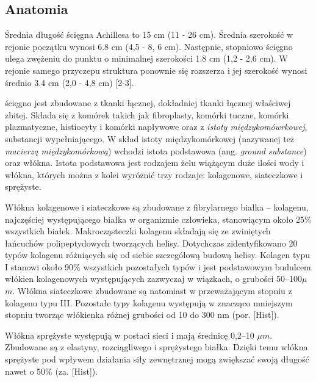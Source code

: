 \subsection{Anatomia}
Średnia długość ścięgna Achillesa to 15 cm (11 - 26 cm). Średnia szerokość w rejonie początku wynosi 6.8 cm (4,5 - 8, 6 cm). Następnie, stopniowo ścięgno ulega zwężeniu do punktu o minimalnej szerokości 1.8 cm (1,2 - 2,6 cm). W rejonie samego przyczepu struktura ponownie się rozszerza i jej szerokość wynosi średnio 3.4 cm (2,0 - 4,8 cm) [2-3].

ścięgno jest zbudowane z tkanki łącznej, dokładniej tkanki łącznej właściwej zbitej. Składa się z komórek takich jak fibroplasty, komórki tuczne, komórki plazmatyczne, histiocyty i komórki napływowe oraz z \textit{istoty międzykomówrkowej}, substancji wypełniającego. W skład istoty międzykomórkowej (nazywanej też \textit{macierzą międzykomórkową}) wchodzi istota podstawowa (ang. \textit{ground substance}) oraz włókna. Istota podstawowa jest rodzajem żelu wiążącym duże ilości wody i włókna, których można z kolei wyróżnić trzy rodzaje: kolagenowe, siateczkowe i sprężyste.

Włókna kolagenowe i siateczkowe są zbudowane z fibrylarnego białka -- kolagenu, najczęściej występującego białka w organizmie człowieka, stanowiącym około 25\% wszystkich białek. Makrocząsteczki kolagenu składają się ze zwiniętych łańcuchów polipeptydowych tworzących helisy. Dotychczas zidentyfikowano 20 typów kolagenu różniących się od siebie szczegółową budową helisy. Kolagen typu I stanowi około 90\% wszystkich pozostałych typów i jest podstawowym budulcem włókien kolagenowych występujących zazwyczaj w wiązkach, o grubości 50--100$\mu$$m$. Włókna siateczkowe zbudowane są natomiast w przeważającym stopniu z kolagenu typu III. Pozostałe typy kolagenu występują w znacząco mniejszym stopniu tworząc włókienka różnej grubości od 10 do 300 nm (por. [Hist]).

Włókna sprężyste występują w postaci sieci i mają średnicę 0,2--10 $\mu$$m$. Zbudowane są z elastyny, rozciągliwego i sprężystego białka. Dzięki temu włókna sprężyste pod wpływem działania siły zewnętrznej mogą zwiększać swoją długość nawet o 50\% (za. [Hist]). 

